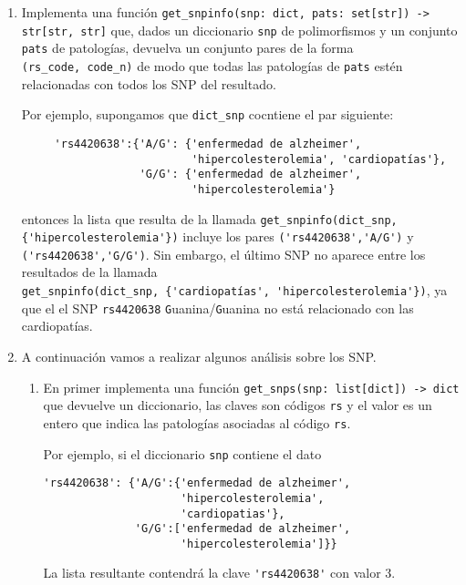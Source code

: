 \documentclass[a4paper,10pt]{article}
\begin{document}
\begin{enumerate}
   \item Implementa una función
     \lstinline|get_snpinfo(snp: dict, pats: set[str]) -> str[str, str]| que, dados un diccionario
     \lstinline{snp} de polimorfismos y un conjunto
     \lstinline{pats} de patologías,
     devuelva un conjunto pares de la forma \\
     \lstinline{(rs_code, code_n)} de modo que todas las patologías de \lstinline{pats} estén relacionadas con todos los SNP del resultado.

     Por ejemplo,  supongamos que \lstinline{dict_snp} cocntiene el par siguiente: \\
\begin{lstlisting}
     'rs4420638':{'A/G': {'enfermedad de alzheimer',
                          'hipercolesterolemia', 'cardiopatías'},
                  'G/G': {'enfermedad de alzheimer',
                          'hipercolesterolemia'}
\end{lstlisting}
     entonces la lista que resulta de la llamada
     \lstinline|get_snpinfo(dict_snp, {'hipercolesterolemia'})|
     incluye los pares \lstinline{('rs4420638','A/G')} y
     \lstinline{('rs4420638','G/G')}.
     Sin embargo, el último SNP no aparece entre los resultados de la
     llamada \\
     \lstinline|get_snpinfo(dict_snp, {'cardiopatías', 'hipercolesterolemia'})|,
     ya que el el SNP \lstinline{rs4420638}
     \lstinline{G}uanina/\lstinline{G}uanina no está relacionado con las cardiopatías.


  \item A continuación vamos a realizar algunos análisis sobre los
    SNP.
    \begin{enumerate}
    \item En primer implementa una función
      \lstinline|get_snps(snp: list[dict]) -> dict| que
      devuelve un diccionario, las claves son
      códigos \lstinline|rs| y el valor es un entero que indica
      las patologías asociadas al código \lstinline|rs|.

      Por ejemplo, si el diccionario \lstinline|snp| contiene el dato
\begin{lstlisting}
'rs4420638': {'A/G':{'enfermedad de alzheimer',
                     'hipercolesterolemia',
                     'cardiopatias'},
              'G/G':['enfermedad de alzheimer',
                     'hipercolesterolemia']}}
\end{lstlisting}
    La lista resultante contendrá la clave \lstinline|'rs4420638'|
    con valor 3.


\end{enumerate}
\end{enumerate}
\end{document}
